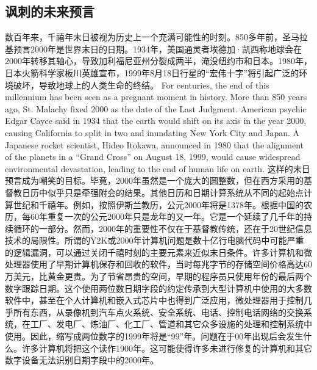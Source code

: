 \subsection{讽刺的未来预言}
\begin{paracol}{2}
数百年来，千禧年末日被视为历史上一个充满可能性的时刻。850多年前，圣马拉基预言2000年是世界末日的日期。1934年，美国通灵者埃德加·凯西称地球会在2000年转移其轴心，导致加利福尼亚州分裂成两半，淹没纽约市和日本。1980年，日本火箭科学家板川英雄宣布，1999年8月18日行星的“宏伟十字”将引起广泛的环境破坏，导致地球上的人类生命的终结。
\switchcolumn
For centuries, the end of this millennium has been seen as a pregnant moment in history. More than 850 years ago, St. Malachy fixed 2000 as the date of the Last Judgment. American psychic Edgar Cayce said in 1934 that the earth would shift on its axis in the year 2000, causing California to split in two and inundating New York City and Japan. A Japanese rocket scientist, Hideo Itokawa, announced in 1980 that the alignment of the planets in a ``Grand Cross'' on August 18, 1999, would cause widespread environmental devastation, leading to the end of human life on earth. 
\switchcolumn*
这样的末日预言成为嘲笑的目标。毕竟，2000年虽然是一个庞大的圆整数，但在西方采用的基督教日历中似乎只是牵强附会的结果。其他日历和日期计算系统从不同的起始点计算世纪和千禧年。例如，按照伊斯兰教历，公元2000年将是1378年。根据中国的农历，每60年重复一次的公元2000年只是龙年的又一年。它是一个延续了几千年的持续循环的一部分。然而，2000年的重要性不仅在于基督教传统，还在于20世纪信息技术的局限性。所谓的Y2K或2000年计算机问题是数十亿行电脑代码中可能严重的逻辑漏洞，可以通过关闭千禧时刻的主要元素来近似末日条件。许多计算机和微处理器使用了早期计算机保存和回收的软件，当时每兆字节的存储空间价格高达60万美元，比黄金更贵。为了节省昂贵的空间，早期的程序员只使用年份的最后两个数字跟踪日期。这个使用两位数日期字段的约定传承到大型计算机中使用的大多数软件中，甚至在个人计算机和嵌入式芯片中也得到广泛应用，微处理器用于控制几乎所有东西，从录像机到汽车点火系统、安全系统、电话、控制电话网络的交换系统，在工厂、发电厂、炼油厂、化工厂、管道和其它众多设施的处理和控制系统中使用。因此，缩写成两位数字的1999年将是“99”年。问题在于00年出现后会发生什么。许多计算机将把这个读作1900年。这可能使得许多未进行修复的计算机和其它数字设备无法识别日期字段中的2000年。
\switchcolumn

\end{paracol}
